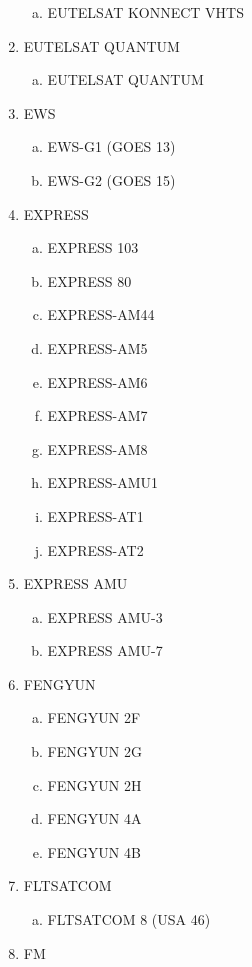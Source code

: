 \begin{multicols}{2}
\begin{enumerate}
\begin{enumerate}[a.]
    \item EUTELSAT KONNECT VHTS
  \end{enumerate}
  \item EUTELSAT QUANTUM
  \begin{enumerate}[a.]
    \item EUTELSAT QUANTUM
  \end{enumerate}
  \item EWS
  \begin{enumerate}[a.]
    \item EWS-G1 (GOES 13)
    \item EWS-G2 (GOES 15)
  \end{enumerate}
  \item EXPRESS
  \begin{enumerate}[a.]
    \item EXPRESS 103
    \item EXPRESS 80
    \item EXPRESS-AM44
    \item EXPRESS-AM5
    \item EXPRESS-AM6
    \item EXPRESS-AM7
    \item EXPRESS-AM8
    \item EXPRESS-AMU1
    \item EXPRESS-AT1
    \item EXPRESS-AT2
  \end{enumerate}
  \item EXPRESS AMU
  \begin{enumerate}[a.]
    \item EXPRESS AMU-3
    \item EXPRESS AMU-7
  \end{enumerate}
  \item FENGYUN
  \begin{enumerate}[a.]
    \item FENGYUN 2F
    \item FENGYUN 2G
    \item FENGYUN 2H
    \item FENGYUN 4A
    \item FENGYUN 4B
  \end{enumerate}
  \item FLTSATCOM
  \begin{enumerate}[a.]
    \item FLTSATCOM 8 (USA 46)
  \end{enumerate}
  \item FM
  \begin{enumerate}[a.]

\end{enumerate}
\end{enumerate}
\end{multicols}

